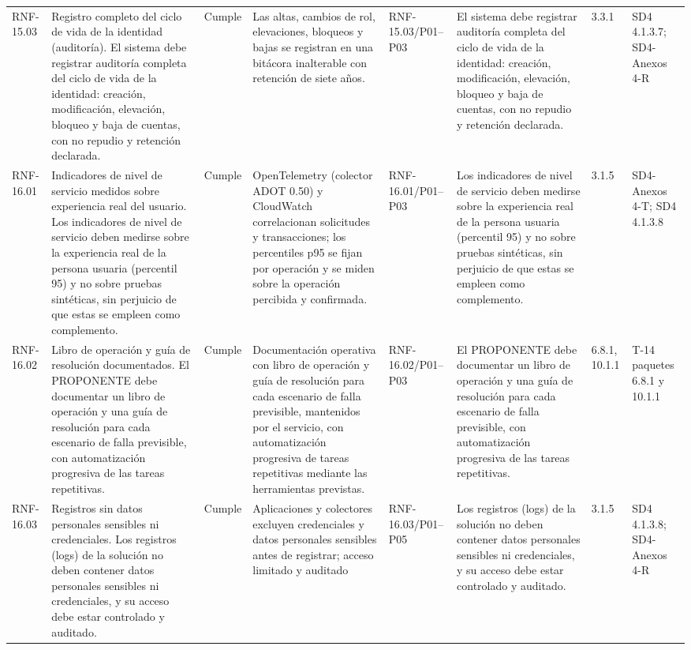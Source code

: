 \documentclass[oficio,firma,final]{lafrox}
\begin{document}
\begin{landscape}
{\begin{longtable}{@{}F{0.054} F{0.173} F{0.061} F{0.191} F{0.106} F{0.180} F{0.067} F{0.168}@{}}
  RNF-15.03 & Registro completo del ciclo de vida de la identidad (auditoría). El sistema debe registrar auditoría completa del ciclo de vida de la identidad: creación, modificación, elevación, bloqueo y baja de cuentas, con no repudio y retención declarada. & Cumple & Las altas, cambios de rol, elevaciones, bloqueos y bajas se registran en una bitácora inalterable con retención de siete años. & RNF-15.03/\allowbreak{}P01--\allowbreak{}P03 & El sistema debe registrar auditoría completa del ciclo de vida de la identidad: creación, modificación, elevación, bloqueo y baja de cuentas, con no repudio y retención declarada. & 3.3.1 & SD4 4.1.3.7; SD4-Anexos 4-R  \\
  RNF-16.01 & Indicadores de nivel de servicio medidos sobre experiencia real del usuario. Los indicadores de nivel de servicio deben medirse sobre la experiencia real de la persona usuaria (percentil 95) y no sobre pruebas sintéticas, sin perjuicio de que estas se empleen como complemento. & Cumple & OpenTelemetry (colector ADOT 0.50) y CloudWatch correlacionan solicitudes y transacciones; los percentiles p95 se fijan por operación y se miden sobre la operación percibida y confirmada. & RNF-16.01/\allowbreak{}P01--\allowbreak{}P03 & Los indicadores de nivel de servicio deben medirse sobre la experiencia real de la persona usuaria (percentil 95) y no sobre pruebas sintéticas, sin perjuicio de que estas se empleen como complemento. & 3.1.5 & SD4-Anexos 4-T; SD4 4.1.3.8  \\
  RNF-16.02 & Libro de operación y guía de resolución documentados. El PROPONENTE debe documentar un libro de operación y una guía de resolución para cada escenario de falla previsible, con automatización progresiva de las tareas repetitivas. & Cumple & Documentación operativa con libro de operación y guía de resolución para cada escenario de falla previsible, mantenidos por el servicio, con automatización progresiva de tareas repetitivas mediante las herramientas previstas. & RNF-16.02/\allowbreak{}P01--\allowbreak{}P03 & El PROPONENTE debe documentar un libro de operación y una guía de resolución para cada escenario de falla previsible, con automatización progresiva de las tareas repetitivas. & 6.8.1, 10.1.1 & T-14 paquetes 6.8.1 y 10.1.1  \\
  RNF-16.03 & Registros sin datos personales sensibles ni credenciales. Los registros (logs) de la solución no deben contener datos personales sensibles ni credenciales, y su acceso debe estar controlado y auditado. & Cumple & Aplicaciones y colectores excluyen credenciales y datos personales sensibles antes de registrar; acceso limitado y auditado & RNF-16.03/\allowbreak{}P01--\allowbreak{}P05 & Los registros (logs) de la solución no deben contener datos personales sensibles ni credenciales, y su acceso debe estar controlado y auditado. & 3.1.5 & SD4 4.1.3.8; SD4-Anexos 4-R  \\

\end{longtable}}
\end{landscape}
\end{document}
